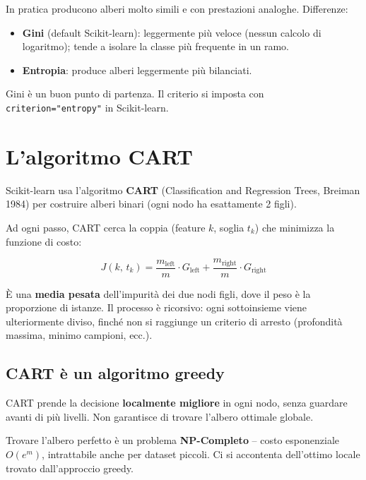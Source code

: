 \begin{notebox}
In pratica producono alberi molto simili e con prestazioni analoghe. Differenze:
\begin{itemize}
    \item \textbf{Gini} (default Scikit-learn): leggermente più veloce (nessun calcolo di logaritmo); tende a isolare la classe più frequente in un ramo.
    \item \textbf{Entropia}: produce alberi leggermente più bilanciati.
\end{itemize}
Gini è un buon punto di partenza. Il criterio si imposta con \texttt{criterion="entropy"} in Scikit-learn.
\end{notebox}

\section{L'algoritmo CART}

Scikit-learn usa l'algoritmo \textbf{CART} (Classification and Regression Trees, Breiman 1984) per costruire alberi binari (ogni nodo ha esattamente 2 figli).

Ad ogni passo, CART cerca la coppia (feature $k$, soglia $t_k$) che minimizza la funzione di costo:

\begin{equation}
\boxed{J(k,\, t_k) = \frac{m_\text{left}}{m} \cdot G_\text{left} + \frac{m_\text{right}}{m} \cdot G_\text{right}}
\end{equation}

È una \textbf{media pesata} dell'impurità dei due nodi figli, dove il peso è la proporzione di istanze. Il processo è ricorsivo: ogni sottoinsieme viene ulteriormente diviso, finché non si raggiunge un criterio di arresto (profondità massima, minimo campioni, ecc.).

\subsection{CART è un algoritmo greedy}

\begin{defbox}
CART prende la decisione \textbf{localmente migliore} in ogni nodo, senza guardare avanti di più livelli. Non garantisce di trovare l'albero ottimale globale.

Trovare l'albero perfetto è un problema \textbf{NP-Completo} -- costo esponenziale $O(e^m)$, intrattabile anche per dataset piccoli. Ci si accontenta dell'ottimo locale trovato dall'approccio greedy.
\end{defbox}

